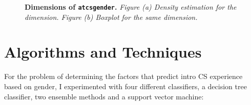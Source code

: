 \begin{figure}[!hbtp]
\centering

    \caption{\textbf{Dimensions of \texttt{atcsgender}.} \textit{Figure (a) Density estimation for the dimension. Figure (b) Boxplot for the same dimension.}}
\end{figure}


\chapter*{Algorithms and Techniques}

For the problem of determining the factors that predict intro CS experience based on gender, I experimented with four different classifiers, a decision tree classifier, two ensemble methods and a support vector machine:

